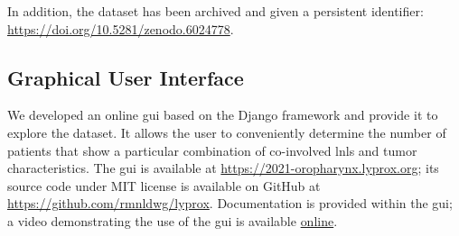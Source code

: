 \documentclass[\relativeRoot/main.tex]{subfiles}
\begin{document}
In addition, the dataset has been archived and given a persistent identifier: \url{https://doi.org/10.5281/zenodo.6024778}.

\subsection*{Graphical User Interface}

We developed an online \gls{gui} based on the Django framework \cite{noauthor_django_2021} and provide it to explore the dataset. It allows the user to conveniently determine the number of patients that show a particular combination of co-involved \glspl{lnl} and tumor characteristics. The \gls{gui} is available at \url{https://2021-oropharynx.lyprox.org}; its source code under MIT license is available on GitHub at \url{https://github.com/rmnldwg/lyprox}. Documentation is provided within the \gls{gui}; a video demonstrating the use of the \gls{gui} is available \href{https://www.sciencedirect.com/science/article/pii/S0167814022000615#s0100}{online}.
\end{document}
